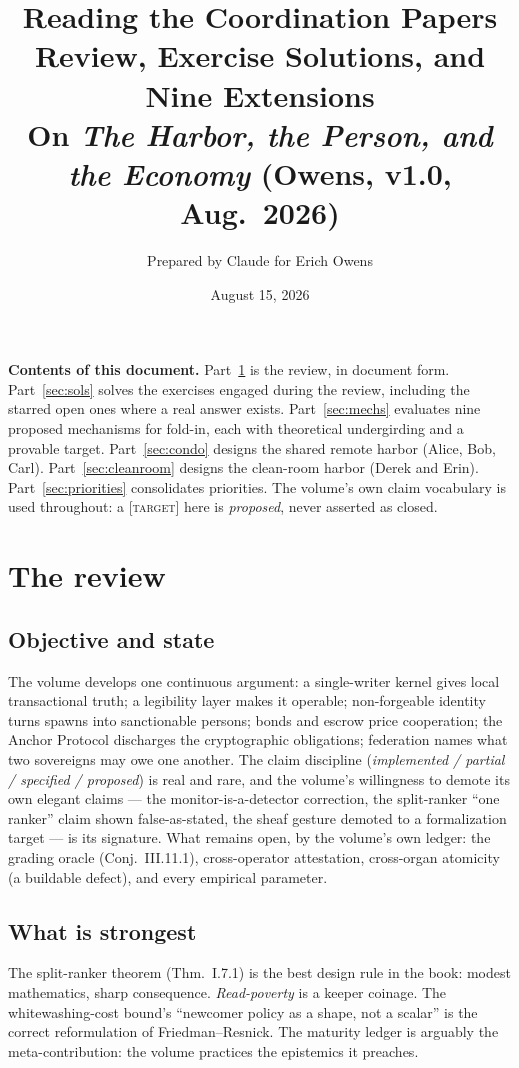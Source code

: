 \documentclass[11pt,a4paper]{article}
\title{\textbf{Reading the Coordination Papers}\\[4pt]
\large Review, Exercise Solutions, and Nine Extensions\\[2pt]
\normalsize On \emph{The Harbor, the Person, and the Economy} (Owens, v1.0, Aug.\ 2026)}
\author{Prepared by Claude for Erich Owens}
\date{August 15, 2026}
\theoremstyle{definition}
\theoremstyle{remark}
\newcommand{\grade}[1]{\textsc{[#1]}}
\begin{document}
\maketitle

\noindent\textbf{Contents of this document.} Part~\ref{sec:review} is the review, in document form. Part~\ref{sec:sols} solves the exercises engaged during the review, including the starred open ones where a real answer exists. Part~\ref{sec:mechs} evaluates nine proposed mechanisms for fold-in, each with theoretical undergirding and a provable target. Part~\ref{sec:condo} designs the shared remote harbor (Alice, Bob, Carl). Part~\ref{sec:cleanroom} designs the clean-room harbor (Derek and Erin). Part~\ref{sec:priorities} consolidates priorities. The volume's own claim vocabulary is used throughout: a \grade{target} here is \emph{proposed}, never asserted as closed.

\section{The review}\label{sec:review}

\subsection{Objective and state}
The volume develops one continuous argument: a single-writer kernel gives local transactional truth; a legibility layer makes it operable; non-forgeable identity turns spawns into sanctionable persons; bonds and escrow price cooperation; the Anchor Protocol discharges the cryptographic obligations; federation names what two sovereigns may owe one another. The claim discipline (\emph{implemented / partial / specified / proposed}) is real and rare, and the volume's willingness to demote its own elegant claims --- the monitor-is-a-detector correction, the split-ranker ``one ranker'' claim shown false-as-stated, the sheaf gesture demoted to a formalization target --- is its signature. What remains open, by the volume's own ledger: the grading oracle (Conj.~III.11.1), cross-operator attestation, cross-organ atomicity (a buildable defect), and every empirical parameter.

\subsection{What is strongest}
The split-ranker theorem (Thm.~I.7.1) is the best design rule in the book: modest mathematics, sharp consequence. \emph{Read-poverty} is a keeper coinage. The whitewashing-cost bound's ``newcomer policy as a shape, not a scalar'' is the correct reformulation of Friedman--Resnick. The maturity ledger is arguably the meta-contribution: the volume practices the epistemics it preaches.
\end{document}
